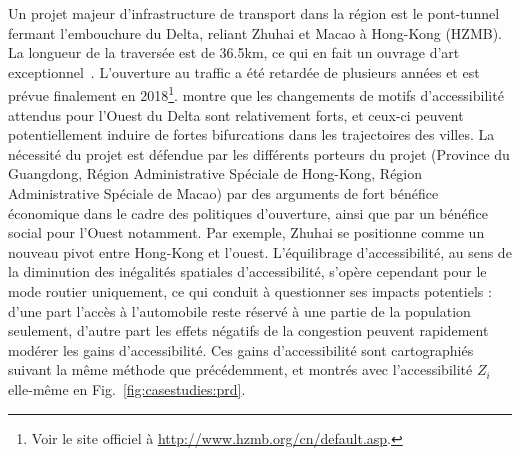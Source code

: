 Un projet majeur d'infrastructure de transport dans la région est le pont-tunnel fermant l'embouchure du Delta, reliant Zhuhai et Macao à Hong-Kong (HZMB). La longueur de la traversée est de 36.5km, ce qui en fait un ouvrage d'art exceptionnel~\cite{hussain2011hong}. L'ouverture au traffic a été retardée de plusieurs années et est prévue finalement en 2018\footnote{Voir le site officiel à \url{http://www.hzmb.org/cn/default.asp}.}. \cite{zhou2016medium} montre que les changements de motifs d'accessibilité attendus pour l'Ouest du Delta sont relativement forts, et ceux-ci peuvent potentiellement induire de fortes bifurcations dans les trajectoires des villes. La nécessité du projet est défendue par les différents porteurs du projet (Province du Guangdong, Région Administrative Spéciale de Hong-Kong, Région Administrative Spéciale de Macao) par des arguments de fort bénéfice économique dans le cadre des politiques d'ouverture, ainsi que par un bénéfice social pour l'Ouest notamment. Par exemple, Zhuhai se positionne comme un nouveau pivot entre Hong-Kong et l'ouest. L'équilibrage d'accessibilité, au sens de la diminution des inégalités spatiales d'accessibilité, s'opère cependant pour le mode routier uniquement, ce qui conduit à questionner ses impacts potentiels : d'une part l'accès à l'automobile reste réservé à une partie de la population seulement, d'autre part les effets négatifs de la congestion peuvent rapidement modérer les gains d'accessibilité. Ces gains d'accessibilité sont cartographiés suivant la même méthode que précédemment, et montrés avec l'accessibilité $Z_i$ elle-même en Fig.~\ref{fig:casestudies:prd}.


